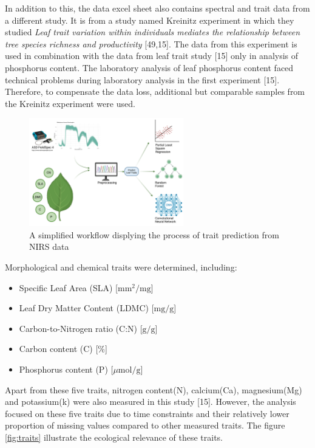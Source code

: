 \documentclass[12pt,a4paper]{report}
\begin{document}
In addition to this, the data excel sheet also contains spectral and trait data from a different study. It is from a study named Kreinitz experiment in which they studied \textit{Leaf trait variation within individuals mediates the relationship between tree species richness and productivity} [49,15]. The data from this experiment is used in combination with the data from leaf trait study [15] only in analysis of phosphorus content. The laboratory analysis of leaf phosphorus content faced technical problems during laboratory analysis in the first experiment [15]. Therefore, to compensate the data loss, additional but comparable samples from the Kreinitz experiment were used.

\begin{figure}[h]
    \centering
    \includegraphics[width=0.6\textwidth]{Figures/nirs.png}
    \caption{A simplified workflow displying the process of trait prediction from NIRS data}
    \label{fig:nirs_workflow}
\end{figure}
Morphological and chemical traits were determined, including:
\begin{itemize}
    \item Specific Leaf Area (SLA)  [$\text{mm}^2/\text{mg}$]
    \item Leaf Dry Matter Content (LDMC)  [$\text{mg}/\text{g}$]
    \item Carbon-to-Nitrogen ratio (C:N)  [$\text{g}/\text{g}$]
    \item Carbon content (C)  [\%]
    \item Phosphorus content (P) [$\mu\text{mol}/\text{g}$]
\end{itemize}

Apart from these five traits, nitrogen content(N), calcium(Ca), magnesium(Mg) and potassium(k) were also measured in this study [15]. However, the analysis focused on these five traits due to time constraints and their relatively lower proportion of missing values compared to other measured traits. The figure \ref{fig:traits} illustrate the ecological relevance of these traits.
\end{document}
